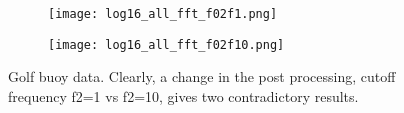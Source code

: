 \begin{figure}[htbp]
    \centering
    \begin{subfigure}[b]{0.49\textwidth}
        \centering
        \texttt{[image: log16\_all\_fft\_f02f1.png]}
        \caption{}
        \label{fig:}
    \end{subfigure}
    \hfill
    \begin{subfigure}[b]{0.49\textwidth}
        \centering
        \texttt{[image: log16\_all\_fft\_f02f10.png]}
        \caption{}
        \label{fig:}
    \end{subfigure}
    \caption{Golf buoy data. Clearly, a change in the post processing, cutoff frequency f2=1 vs f2=10, gives two contradictory results.}
    \label{fig:}
\end{figure}

